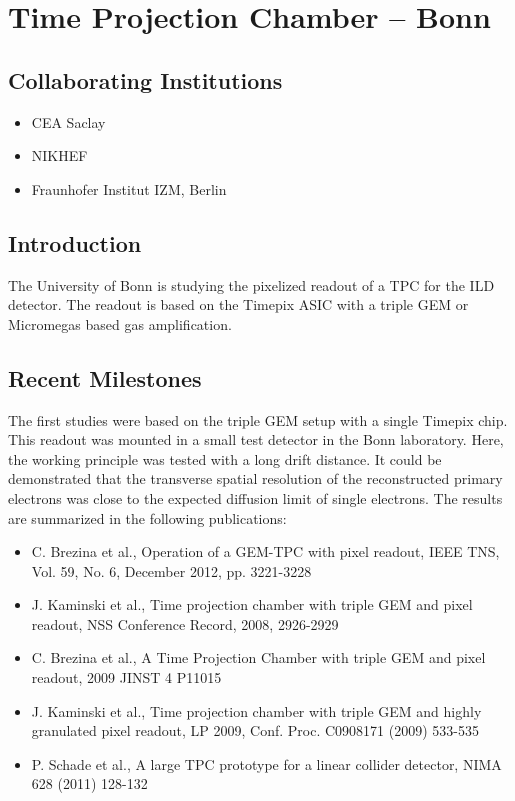 \section{Time Projection Chamber -- Bonn}
\subsection{Collaborating Institutions}
\begin{itemize}
	\item CEA Saclay
	\item NIKHEF
	\item Fraunhofer Institut IZM, Berlin
\end{itemize}
\subsection{Introduction}
The University of Bonn is studying the pixelized readout of a TPC for the ILD detector. The readout is based on the Timepix ASIC with a triple GEM or Micromegas based gas amplification.

\subsection{Recent Milestones}
The first studies were based on the triple GEM setup with a single Timepix chip. This readout was mounted in a small test detector in the Bonn laboratory. Here, the working principle was tested with a long drift distance. It could be demonstrated that the transverse spatial resolution of the reconstructed primary electrons was close to the expected diffusion limit of single electrons. The results are summarized in the following publications:
\begin{itemize}
\item C. Brezina et al., Operation of a GEM-TPC with pixel readout, IEEE TNS, Vol. 59, No. 6, December 2012, pp. 3221-3228
\item J. Kaminski et al., Time projection chamber with triple GEM and pixel readout, NSS Conference Record, 2008, 2926-2929
\item C. Brezina et al., A Time Projection Chamber with triple GEM and pixel readout, 2009 JINST 4 P11015
\item J. Kaminski et al., Time projection chamber with triple GEM and highly granulated pixel readout, LP 2009, Conf. Proc. C0908171 (2009) 533-535
\item P. Schade et al., A large TPC prototype for a linear collider detector, NIMA 628 (2011) 128-132
\end{itemize}

